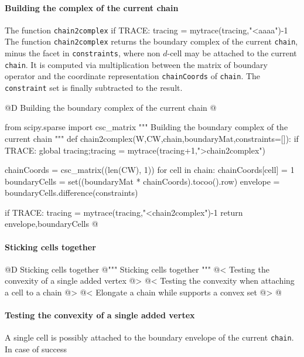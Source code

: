 \documentclass[11pt,oneside]{article}	%
\begin{document}
\paragraph{Building the complex of the current chain}

The function \texttt{chain2complex} if TRACE: tracing = mytrace(tracing,"<aaaa")-1
The function \texttt{chain2complex} returns the boundary complex of the current \texttt{chain}, minus the facet in \texttt{constraints}, where non $d$-cell may be attached to the current \texttt{chain}.
It is computed via multiplication between the matrix of boundary operator and the coordinate representation \texttt{chainCoords} of \texttt{chain}. The \texttt{constraint} set is finally subtracted to the result.  

@D Building the boundary complex of the current chain
@{from scipy.sparse import csc_matrix
""" Building the boundary complex of the current chain """
def chain2complex(W,CW,chain,boundaryMat,constraints=[]):
	if TRACE: global tracing;tracing = mytrace(tracing+1,">chain2complex")

	chainCoords = csc_matrix((len(CW), 1))
	for cell in chain: chainCoords[cell] = 1
	boundaryCells = set((boundaryMat * chainCoords).tocoo().row)
	envelope = boundaryCells.difference(constraints)

	if TRACE: tracing = mytrace(tracing,"<chain2complex")-1
	return envelope,boundaryCells
@}



\paragraph{Sticking cells together}
@D Sticking cells together
@{""" Sticking cells together """
@< Testing the convexity of a single added vertex @>
@< Testing the convexity when attaching a cell to a chain @>
@< Elongate a chain while supports a convex set @>
@}

\paragraph{Testing the convexity of a single added vertex}
A single cell is possibly attached to the boundary envelope of the current \texttt{chain}. In case of success
\end{document}
